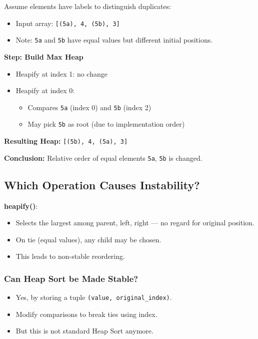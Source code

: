 \documentclass[14pt]{extarticle}
\begin{document}
Assume elements have labels to distinguish duplicates:

\begin{itemize}
    \item Input array: \texttt{[(5a), 4, (5b), 3]}
    \item Note: \texttt{5a} and \texttt{5b} have equal values but different initial positions.
\end{itemize}

\textbf{Step: Build Max Heap}
\begin{itemize}
    \item Heapify at index 1: no change
    \item Heapify at index 0:
        \begin{itemize}
            \item Compares \texttt{5a} (index 0) and \texttt{5b} (index 2)
            \item May pick \texttt{5b} as root (due to implementation order)
        \end{itemize}
\end{itemize}

\textbf{Resulting Heap:} \texttt{[(5b), 4, (5a), 3]}

\textbf{Conclusion:} Relative order of equal elements \texttt{5a}, \texttt{5b} is changed.

\vspace{1em}

\subsection*{Which Operation Causes Instability?}
\textbf{heapify()}:
\begin{itemize}
    \item Selects the largest among parent, left, right — no regard for original position.
    \item On tie (equal values), any child may be chosen.
    \item This leads to non-stable reordering.
\end{itemize}


\vspace{1em}

\subsubsection*{Can Heap Sort be Made Stable?}

\begin{itemize}
    \item Yes, by storing a tuple \texttt{(value, original\_index)}.
    \item Modify comparisons to break ties using index.
    \item But this is not standard Heap Sort anymore.
\end{itemize}
\end{document}

